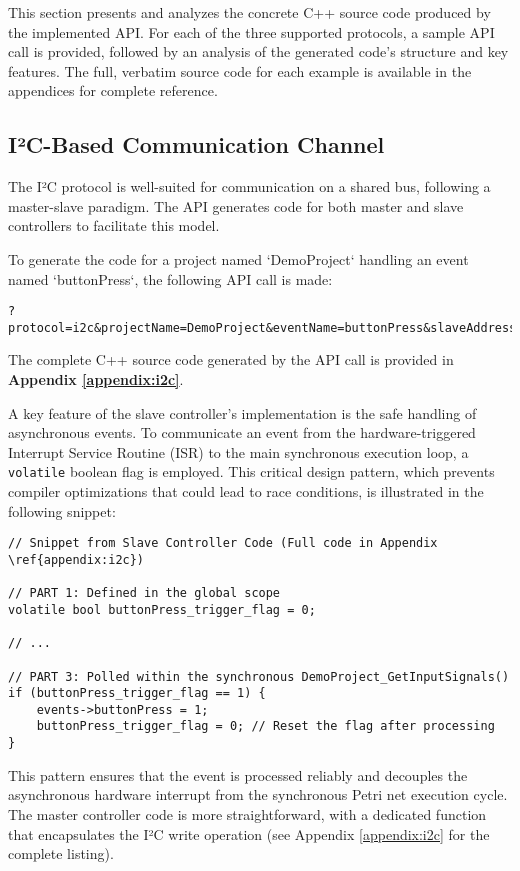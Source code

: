 This section presents and analyzes the concrete C++ source code produced by the implemented API. For each of the three supported protocols, a sample API call is provided, followed by an analysis of the generated code's structure and key features. The full, verbatim source code for each example is available in the appendices for complete reference.

\subsection{I²C-Based Communication Channel}
\label{subsec:i2c_analysis}

The I²C protocol is well-suited for communication on a shared bus, following a master-slave paradigm. The API generates code for both master and slave controllers to facilitate this model.

To generate the code for a project named `DemoProject` handling an event named `buttonPress`, the following API call is made:
\begin{verbatim}
?protocol=i2c&projectName=DemoProject&eventName=buttonPress&slaveAddress=9&slaveMessage=P
\end{verbatim}

The complete C++ source code generated by the API call is provided in \textbf{Appendix \ref{appendix:i2c}}.

A key feature of the slave controller's implementation is the safe handling of asynchronous events. To communicate an event from the hardware-triggered Interrupt Service Routine (ISR) to the main synchronous execution loop, a \texttt{volatile} boolean flag is employed. This critical design pattern, which prevents compiler optimizations that could lead to race conditions, is illustrated in the following snippet:

\begin{verbatim}
// Snippet from Slave Controller Code (Full code in Appendix \ref{appendix:i2c})

// PART 1: Defined in the global scope
volatile bool buttonPress_trigger_flag = 0;

// ...

// PART 3: Polled within the synchronous DemoProject_GetInputSignals()
if (buttonPress_trigger_flag == 1) {
    events->buttonPress = 1;
    buttonPress_trigger_flag = 0; // Reset the flag after processing
}
\end{verbatim}
This pattern ensures that the event is processed reliably and decouples the asynchronous hardware interrupt from the synchronous Petri net execution cycle. The master controller code is more straightforward, with a dedicated function that encapsulates the I²C write operation (see Appendix \ref{appendix:i2c} for the complete listing).

